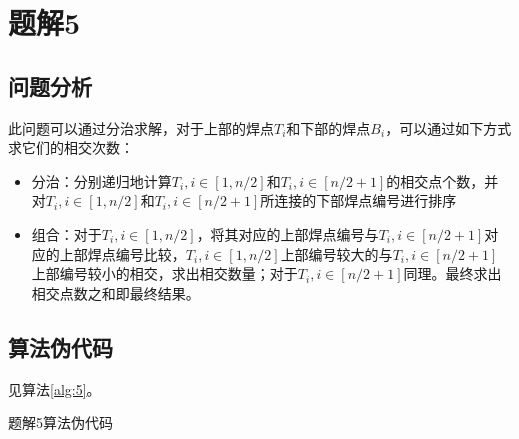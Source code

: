 \section{题解5}
\subsection{问题分析}
此问题可以通过分治求解，对于上部的焊点$T_i$和下部的焊点$B_i$，可以通过如下方式求它们的相交次数：
\begin{itemize}
    \item 分治：分别递归地计算$T_i,i\in[1,n/2]$和$T_i,i\in[n/2+1]$的相交点个数，并对$T_i,i\in[1,n/2]$和$T_i,i\in[n/2+1]$所连接的下部焊点编号进行排序
    \item 组合：对于$T_i,i\in[1,n/2]$，将其对应的上部焊点编号与$T_i,i\in[n/2+1]$对应的上部焊点编号比较，$T_i,i\in[1,n/2]$上部编号较大的与$T_i,i\in[n/2+1]$上部编号较小的相交，求出相交数量；对于$T_i,i\in[n/2+1]$同理。最终求出相交点数之和即最终结果。
\end{itemize}

\subsection{算法伪代码}
见算法\ref{alg:5}。
\begin{algorithm}[htbp]
\caption{题解5算法伪代码}\label{alg:5}
\end{algorithm}